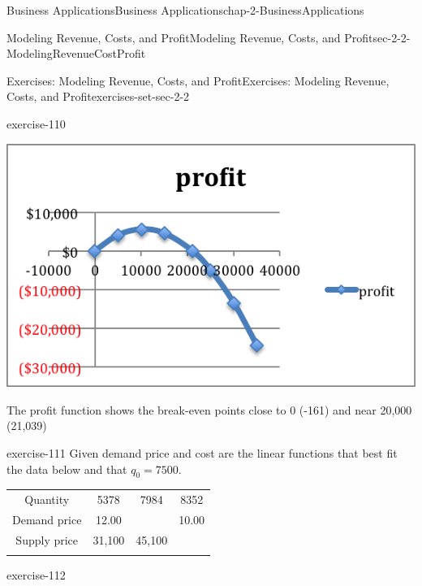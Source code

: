 \documentclass[oneside,10pt,]{book}
\numberwithin{equation}{section}
\newcommand{\hrulethin}  {\noalign{\hrule height 0.04em}}
\newcommand{\hrulemedium}{\noalign{\hrule height 0.07em}}
\newcommand{\hrulethick} {\noalign{\hrule height 0.11em}}
\begin{document}
\begin{chapterptx}{Business Applications}{}{Business Applications}{}{}{chap-2-BusinessApplications}
\begin{sectionptx}{Modeling Revenue, Costs, and Profit}{}{Modeling Revenue, Costs, and Profit}{}{}{sec-2-2-ModelingRevenueCostProfit}
\begin{exercises-subsection-numberless}{Exercises: Modeling Revenue, Costs, and Profit}{}{Exercises: Modeling Revenue, Costs, and Profit}{}{}{exercises-set-sec-2-2}
\begin{exercisegroup}
\begin{divisionexerciseeg}{7}{}{}{exercise-110}
\begin{enumerate}[label=(\alph*)]
\begin{sidebyside}{1}{0}{0}{0}
\begin{sbspanel}{1}
\includegraphics[width=1\linewidth]{images/sec2-2-sol7c.png}
\end{sbspanel}%
\end{sidebyside}%
\par
\hypertarget{p-741}{}%
The profit function shows the break-even points close to 0 (-161) and near 20,000 (21,039)%
\end{enumerate}
\end{divisionexerciseeg}%
\begin{divisionexerciseeg}{8}{}{}{exercise-111}%
\hypertarget{p-742}{}%
Given demand price and cost are the linear functions that best fit the data below and that \(q_0=7500\).%
\begin{sidebyside}{1}{0}{0}{0}%
\begin{sbspanel}{1}%
{\centering%
\begin{tabular}{cccc}\hrulethick
Quantity&5378&7984&8352\tabularnewline\hrulethin
Demand price&\textdollar{}12.00&&\textdollar{}10.00\tabularnewline\hrulemedium
Supply price&\textdollar{}31,100&\textdollar{}45,100&\tabularnewline\hrulemedium
\end{tabular}
\par}
\end{sbspanel}%
\end{sidebyside}%
\end{divisionexerciseeg}%
\end{exercisegroup}
\par\medskip\noindent
\begin{divisionexercise}{9}{}{}{exercise-112}%
\hypertarget{p-743}{}%

\end{divisionexercise}
\end{exercises-subsection-numberless}
\end{sectionptx}
\end{chapterptx}
\end{document}
